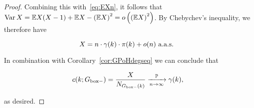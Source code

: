 \begin{proof}
\noindent
Combining this with~\eqref{eq:EXn}, it follows that 
$\operatorname{Var} X = {\mathbb E} X(X-1) + {\mathbb E} X - \left({\mathbb E} X\right)^2 = o\left( \left({\mathbb E} X\right)^2 \right)$.
 By Chebychev's inequality, we therefore have 
 
 $$ X = n \cdot \gamma(k) \cdot {\pi}(k) + o(n) \text{ a.a.s. } $$
 
In combination with Corollary~\ref{cor:GPoHdegseq} we can conclude that

$$ c(k;G_{\mathrm{box}-}) = \frac{X}{N_{G_{\mathrm{box}-}(k)}} \xrightarrow[n\to\infty]{\mathbb{P}} \gamma(k), $$

\noindent
as desired.
 \end{proof}

 
 
 
%
